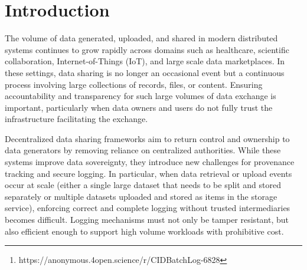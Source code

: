 \documentclass{svproc}
\def\github{\xspace{https://anonymous.4open.science/r/CIDBatchLog-6828}\xspace}
\def\ours{\xspace{CIDBatchLog}\xspace}
\begin{document}
\begin{abstract}
With the increasing volume of generated data across various domains, data sharing has become more and more prevalent and the need for guaranteeing the accountability and traceability of the shared data has drawn attention from the academia. Although existing decentralized sharing platforms return control and ownership to data owners, provenance tracking and secure logging under the decentralized environment is yet to be trivial. Recently, a lot of blockchain-based logging schemes have been proposed to address such concerns of secure logging, but there is still a research gap on the performance of these protocols when the volume of the shared data becomes large. \ours is a logging contract for decentralized data sharing. Rather than logging each upload event separately, it commits a batch of IPFS content identifiers (CIDs) to a single on-chain hash, amortizing transaction overhead across the whole batch. At 100 CIDs, this cuts per-item gas cost by 43$\times$ compared to a standard logging-only HTLC; the gap widens as batch size grows. Source code is available at~\footnote{\github}.
\end{abstract}

\section{Introduction}
The volume of data generated, uploaded, and shared in modern distributed systems continues to grow rapidly across domains such as healthcare, scientific collaboration, Internet-of-Things (IoT), and large scale data marketplaces. In these settings, data sharing is no longer an occasional event but a continuous process involving large collections of records, files, or content. Ensuring accountability and transparency for such large volumes of data exchange is important, particularly when data owners and users do not fully trust the infrastructure facilitating the exchange.

Decentralized data sharing frameworks aim to return control and ownership to data generators by removing reliance on centralized authorities. While these systems improve data sovereignty, they introduce new challenges for provenance tracking and secure logging. In particular, when data retrieval or upload events occur at scale (either a single large dataset that needs to be split and stored separately or multiple datasets uploaded and stored as items in the storage service), enforcing correct and complete logging without trusted intermediaries becomes difficult. Logging mechanisms must not only be tamper resistant, but also efficient enough to support high volume workloads with prohibitive cost.
\end{document}
